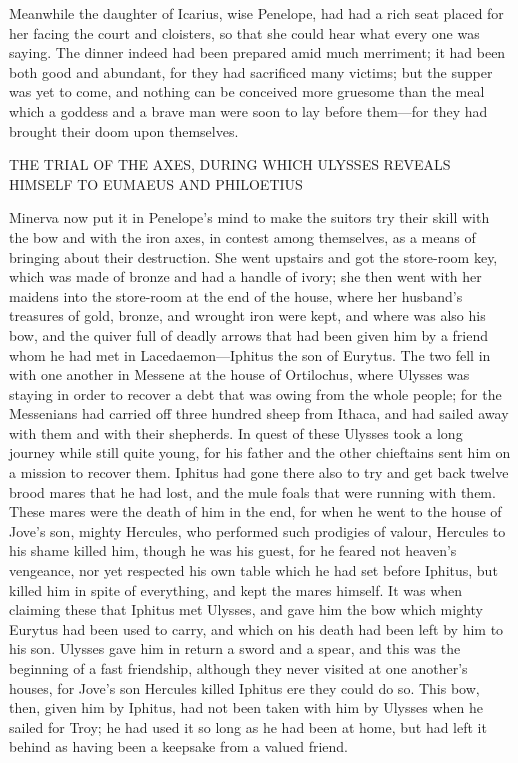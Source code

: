 Meanwhile the daughter of Icarius, wise Penelope, had had a rich seat placed
for her facing the court and cloisters, so that she could hear what every one
was saying. The dinner indeed had been prepared amid much merriment; it had
been both good and abundant, for they had sacrificed many victims; but the
supper was yet to come, and nothing can be conceived more gruesome than the
meal which a goddess and a brave man were soon to lay before them—for they had
brought their doom upon themselves.


THE TRIAL OF THE AXES, DURING WHICH ULYSSES REVEALS HIMSELF TO EUMAEUS AND
PHILOETIUS

Minerva now put it in Penelope’s mind to make the suitors try their skill with
the bow and with the iron axes, in contest among themselves, as a means of
bringing about their destruction. She went upstairs and got the store-room key,
which was made of bronze and had a handle of ivory; she then went with her
maidens into the store-room at the end of the house, where her husband’s
treasures of gold, bronze, and wrought iron were kept, and where was also his
bow, and the quiver full of deadly arrows that had been given him by a friend
whom he had met in Lacedaemon—Iphitus the son of Eurytus. The two fell in with
one another in Messene at the house of Ortilochus, where Ulysses was staying in
order to recover a debt that was owing from the whole people; for the
Messenians had carried off three hundred sheep from Ithaca, and had sailed away
with them and with their shepherds. In quest of these Ulysses took a long
journey while still quite young, for his father and the other chieftains sent
him on a mission to recover them. Iphitus had gone there also to try and get
back twelve brood mares that he had lost, and the mule foals that were running
with them. These mares were the death of him in the end, for when he went to
the house of Jove’s son, mighty Hercules, who performed such prodigies of
valour, Hercules to his shame killed him, though he was his guest, for he
feared not heaven’s vengeance, nor yet respected his own table which he had set
before Iphitus, but killed him in spite of everything, and kept the mares
himself. It was when claiming these that Iphitus met Ulysses, and gave him the
bow which mighty Eurytus had been used to carry, and which on his death had
been left by him to his son. Ulysses gave him in return a sword and a spear,
and this was the beginning of a fast friendship, although they never visited at
one another’s houses, for Jove’s son Hercules killed Iphitus ere they could do
so. This bow, then, given him by Iphitus, had not been taken with him by
Ulysses when he sailed for Troy; he had used it so long as he had been at home,
but had left it behind as having been a keepsake from a valued friend.

